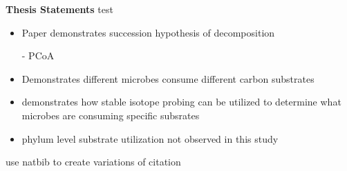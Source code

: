 \textbf{Thesis Statements}
test
\begin{itemize}
\item Paper demonstrates succession hypothesis of decomposition
     
     - PCoA
\item Demonstrates different microbes consume different carbon substrates
\item demonstrates how stable isotope probing can be utilized to determine what microbes are consuming specific subsrates
\item phylum level substrate utilization not observed in this study
\end{itemize}



use natbib to create variations of citation




